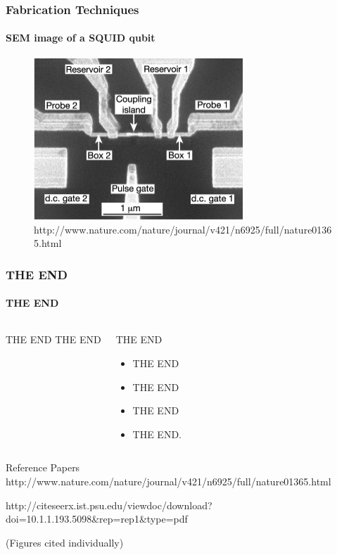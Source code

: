 \documentclass{beamer}
\begin{document}
\begin{frame}
    \frametitle{Fabrication Techniques}
    \framesubtitle{SEM image of a SQUID qubit}
    \begin{figure}[ht!]
        \centering
        \includegraphics[width=0.7\textwidth]{img/two-qubit-sem.jpg}
        \caption{http://www.nature.com/nature/journal/v421/n6925/full/nature01365.html}
    \end{figure}
\end{frame}


\begin{frame}
    \frametitle{THE END}
    \framesubtitle{THE END}
    \begin{block}{}
        \begin{columns}
                \begin{block}{THE END}
                    THE END
                \end{block}
                \begin{block}{THE END}
                    \begin{itemize}
                        \item THE END
                        \item THE END
                        \item THE END
                        \item THE END.
                    \end{itemize}
                \end{block}
        \end{columns}
    \end{block}
    \begin{block}{Reference Papers}
        \fontsize{6}{7.2}\selectfont
        http://www.nature.com/nature/journal/v421/n6925/full/nature01365.html

        http://citeseerx.ist.psu.edu/viewdoc/download?doi=10.1.1.193.5098\&rep=rep1\&type=pdf

        (Figures cited individually)
    \end{block}
\end{frame}
\end{document}
